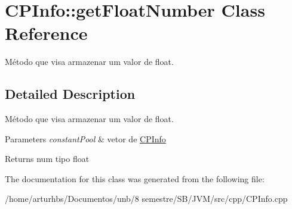 \hypertarget{classCPInfo_1_1getFloatNumber}{}\section{C\+P\+Info\+:\+:get\+Float\+Number Class Reference}
\label{classCPInfo_1_1getFloatNumber}


Método que visa armazenar um valor de float.  




\subsection{Detailed Description}
Método que visa armazenar um valor de float. 


\begin{DoxyParams}{Parameters}
{\em constant\+Pool} & vetor de \hyperlink{classCPInfo}{C\+P\+Info} \\
\hline
\end{DoxyParams}
\begin{DoxyReturn}{Returns}
num tipo float 
\end{DoxyReturn}


The documentation for this class was generated from the following file\+:\begin{DoxyCompactItemize}
\item 
/home/arturhbs/\+Documentos/unb/8 semestre/\+S\+B/\+J\+V\+M/src/cpp/C\+P\+Info.\+cpp\end{DoxyCompactItemize}
